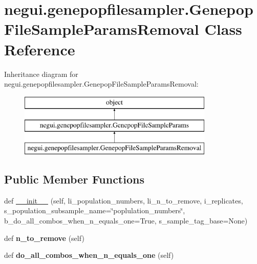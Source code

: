 \hypertarget{classnegui_1_1genepopfilesampler_1_1GenepopFileSampleParamsRemoval}{}\section{negui.\+genepopfilesampler.\+Genepop\+File\+Sample\+Params\+Removal Class Reference}
\label{classnegui_1_1genepopfilesampler_1_1GenepopFileSampleParamsRemoval}
Inheritance diagram for negui.\+genepopfilesampler.\+Genepop\+File\+Sample\+Params\+Removal\+:\begin{figure}[H]
\begin{center}
\leavevmode
\includegraphics[height=3.000000cm]{classnegui_1_1genepopfilesampler_1_1GenepopFileSampleParamsRemoval}
\end{center}
\end{figure}
\subsection*{Public Member Functions}
\begin{DoxyCompactItemize}
\item 
def \hyperlink{classnegui_1_1genepopfilesampler_1_1GenepopFileSampleParamsRemoval_a9c785c09d8cc183ebc0194eb2e932b20}{\+\_\+\+\_\+init\+\_\+\+\_\+} (self, li\+\_\+population\+\_\+numbers, li\+\_\+n\+\_\+to\+\_\+remove, i\+\_\+replicates, s\+\_\+population\+\_\+subsample\+\_\+name=\char`\"{}poplulation\+\_\+numbers\char`\"{}, b\+\_\+do\+\_\+all\+\_\+combos\+\_\+when\+\_\+n\+\_\+equals\+\_\+one=True, s\+\_\+sample\+\_\+tag\+\_\+base=None)
\item 
def {\bfseries n\+\_\+to\+\_\+remove} (self)\hypertarget{classnegui_1_1genepopfilesampler_1_1GenepopFileSampleParamsRemoval_a7621d89a31284b0d6d8b49598eb1860d}{}\label{classnegui_1_1genepopfilesampler_1_1GenepopFileSampleParamsRemoval_a7621d89a31284b0d6d8b49598eb1860d}

\item 
def {\bfseries do\+\_\+all\+\_\+combos\+\_\+when\+\_\+n\+\_\+equals\+\_\+one} (self)\hypertarget{classnegui_1_1genepopfilesampler_1_1GenepopFileSampleParamsRemoval_a6999b2175c9660123c62495ff155ad08}{}\label{classnegui_1_1genepopfilesampler_1_1GenepopFileSampleParamsRemoval_a6999b2175c9660123c62495ff155ad08}

\end{DoxyCompactItemize}


